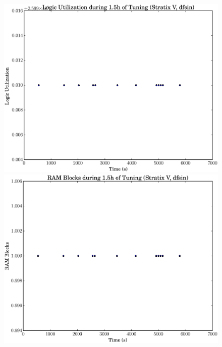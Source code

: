 \documentclass[12pt, a4paper]{article}
\begin{document}
\begin{figure}[htpb]
    \centering
    \noindent
    \begin{minipage}{.48\textwidth}
        \centering
        \includegraphics[scale=.25]{dfsin_lu_5400_chstone_StratixV}
    \end{minipage}%
    \hfill
    \begin{minipage}{.48\textwidth}
        \centering
        \includegraphics[scale=.25]{dfsin_ram_5400_chstone_StratixV}
    \end{minipage}%


\end{figure}
\end{document}
